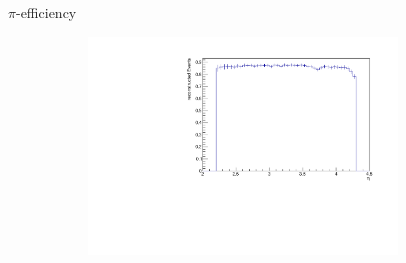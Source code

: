 \documentclass[11pt]{beamer}
\begin{document}
\begin{frame}{$\pi$-efficiency}
\begin{figure}
\begin{subfigure}{0.45\textwidth}
\end{subfigure}
\begin{subfigure}{0.45\textwidth}
\includegraphics[width=0.9\textwidth]{up_pdf/pos/h_eta_reco_Pi_pos.pdf}
\end{subfigure}
\end{figure}
\end{frame}
\end{document}
